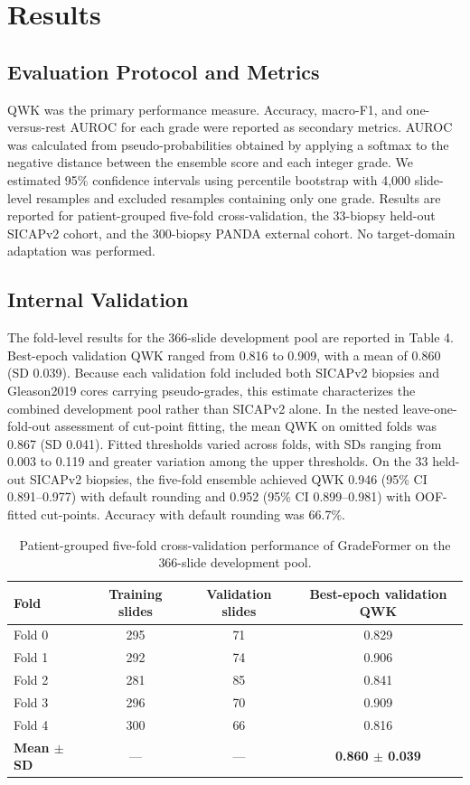 \documentclass[11pt,a4paper]{article}
\begin{document}
\section{Results}

\subsection{Evaluation Protocol and Metrics}
QWK was the primary performance measure. Accuracy, macro-F1, and one-versus-rest AUROC for each grade were reported as secondary metrics. AUROC was calculated from pseudo-probabilities obtained by applying a softmax to the negative distance between the ensemble score and each integer grade. We estimated 95\% confidence intervals using percentile bootstrap with 4,000 slide-level resamples and excluded resamples containing only one grade. Results are reported for patient-grouped five-fold cross-validation, the 33-biopsy held-out SICAPv2 cohort, and the 300-biopsy PANDA external cohort. No target-domain adaptation was performed.


\subsection{Internal Validation}
The fold-level results for the 366-slide development pool are reported in Table 4. Best-epoch validation QWK ranged from 0.816 to 0.909, with a mean of 0.860 (SD 0.039). Because each validation fold included both SICAPv2 biopsies and Gleason2019 cores carrying pseudo-grades, this estimate characterizes the combined development pool rather than SICAPv2 alone. In the nested leave-one-fold-out assessment of cut-point fitting, the mean QWK on omitted folds was 0.867 (SD 0.041). Fitted thresholds varied across folds, with SDs ranging from 0.003 to 0.119 and greater variation among the upper thresholds. On the 33 held-out SICAPv2 biopsies, the five-fold ensemble achieved QWK 0.946 (95\% CI 0.891--0.977) with default rounding and 0.952 (95\% CI 0.899--0.981) with OOF-fitted cut-points. Accuracy with default rounding was 66.7\%.


\begin{table}[H]
\centering
\small
\renewcommand{\arraystretch}{1.15}
\caption{Patient-grouped five-fold cross-validation performance of GradeFormer on the 366-slide development pool.}
\label{tab:cv_results}
\begin{tabularx}{\textwidth}{lCCC}
\toprule
\textbf{Fold} & \textbf{Training slides} & \textbf{Validation slides} & \textbf{Best-epoch validation QWK} \\
\midrule
Fold 0 & 295 & 71 & 0.829 \\
Fold 1 & 292 & 74 & 0.906 \\
Fold 2 & 281 & 85 & 0.841 \\
Fold 3 & 296 & 70 & 0.909 \\
Fold 4 & 300 & 66 & 0.816 \\
\midrule
\textbf{Mean $\pm$ SD} & --- & --- & \textbf{0.860 $\pm$ 0.039} \\
\bottomrule
\end{tabularx}
\end{table}
\end{document}

